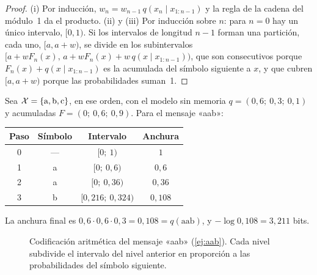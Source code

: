 \begin{proof}
(i) Por inducción, $w_n=w_{n-1}\,q(x_n\mid x_{1:n-1})$ y la regla de la cadena del módulo~1 da el producto. (ii) y (iii) Por inducción sobre $n$: para $n=0$ hay un único intervalo, $[0,1)$. Si los intervalos de longitud $n-1$ forman una partición, cada uno, $[a,a+w)$, se divide en los subintervalos $[a+wF_n(x),\,a+wF_n(x)+w\,q(x\mid x_{1:n-1}))$, que son consecutivos porque $F_n(x)+q(x\mid x_{1:n-1})$ es la acumulada del símbolo siguiente a $x$, y que cubren $[a,a+w)$ porque las probabilidades suman~1.
\end{proof}

\begin{ejemplo}\label{ej:aab}
Sea $\mathcal{X}=\{\mathrm{a},\mathrm{b},\mathrm{c}\}$, en ese orden, con el modelo sin memoria $q=(0{,}6;\ 0{,}3;\ 0{,}1)$ y acumuladas $F=(0;\ 0{,}6;\ 0{,}9)$. Para el mensaje «aab»:
\begin{center}
\begin{tabular}{@{}cccc@{}}
\toprule
Paso & Símbolo & Intervalo & Anchura \\
\midrule
0 & --- & $[0;\ 1)$ & $1$ \\
1 & a & $[0;\ 0{,}6)$ & $0{,}6$ \\
2 & a & $[0;\ 0{,}36)$ & $0{,}36$ \\
3 & b & $[0{,}216;\ 0{,}324)$ & $0{,}108$ \\
\bottomrule
\end{tabular}
\end{center}
La anchura final es $0{,}6\cdot 0{,}6\cdot 0{,}3=0{,}108=q(\text{aab})$, y $-\log 0{,}108=3{,}211$ bits.
\end{ejemplo}

\begin{figure}[h]
\centering
{}
\caption{Codificación aritmética del mensaje «aab» (\cref{ej:aab}). Cada nivel subdivide el intervalo del nivel anterior en proporción a las probabilidades del símbolo siguiente.}
\label{fig:aritmetica}
\end{figure}

